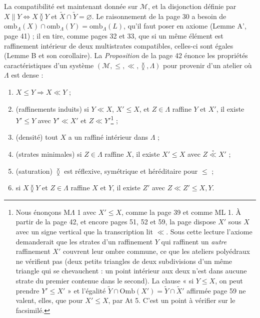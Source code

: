 \documentclass[11pt,a4paper]{article}
\begin{document}
La compatibilité est maintenant donnée sur $\mathcal{M}$, et la disjonction
définie par $X \parallel Y \iff X \between Y$ et $\widetilde{X} \cap \widetilde{Y}
= \varnothing$. Le raisonnement de la page 30 a besoin de $\mathrm{omb}_{\Lambda}(X)
\cap \mathrm{omb}_{\Lambda}(Y) = \mathrm{omb}_{\Lambda}(L)$, qu'il faut poser en
axiome (Lemme A', page 41) ; il en tire, comme pages 32 et 33, que si un même
élément est raffinement intérieur de deux multistrates compatibles, celles-ci sont
égales (Lemme B et son corollaire).
La \emph{Proposition} de la page 42 énonce les propriétés
caractéristiques d'un système $(\mathcal{M}, \leq, \ll, \between, \Lambda)$ pour
provenir d'un atelier où $\Lambda$ est dense :
\begin{enumerate}
\item[\textbf{M$\Lambda$ 0}] $X \leq Y \Rightarrow X \ll Y$ ;
\item[\textbf{M$\Lambda$ 1}] (raffinements induits) si $Y \ll X$, $X' \leq X$, et
$Z \in \Lambda$ raffine $Y$ et $X'$, il existe $Y' \leq Y$ avec $Y' \ll X'$ et $Z
\ll Y'$\footnote{Nous énonçons M$\Lambda$ 1 avec $X' \leq X$, comme la page 39 et
comme ML 1. À partir de la page 42, et encore pages 51, 52 et 59, la page dispose
$X'$ sous $X$ avec un signe vertical que la transcription lit $\ll$. Sous cette
lecture l'axiome demanderait que les strates d'un raffinement $Y$ qui raffinent un
\emph{autre} raffinement $X'$ couvrent leur ombre commune, ce que les ateliers
polyédraux ne vérifient pas (deux petits triangles de deux subdivisions d'un même
triangle qui se chevauchent : un point intérieur aux deux n'est dans aucune
strate du premier contenue dans le second). La clause « si $Y \leq X$, on peut
prendre $Y' \leq X'$ » et l'égalité $\widetilde{Y} \cap \mathrm{Omb}(X') =
\widetilde{Y} \cap \widetilde{X}'$ affirmée page 59 ne valent, elles, que pour $X'
\leq X$, par At 5. C'est un point à vérifier sur le facsimilé.} ;
\item[\textbf{M$\Lambda$ 2}] (densité) tout $X$ a un raffiné intérieur dans
$\Lambda$ ;
\item[\textbf{M$\Lambda$ 3}] (strates minimales) si $Z \in \Lambda$ raffine $X$, il
existe $X' \leq X$ avec $Z \mathrel{\overset{\circ}{\ll}} X'$ ;
\item[\textbf{M$\Lambda$ 4}] (saturation) $\between$ est réflexive, symétrique et
héréditaire pour $\leq$ ;
\item[\textbf{M$\Lambda$ 5}] si $X \between Y$ et $Z \in \Lambda$ raffine $X$ et
$Y$, il existe $Z'$ avec $Z \ll Z' \leq X, Y$.
\end{enumerate}
\end{document}
